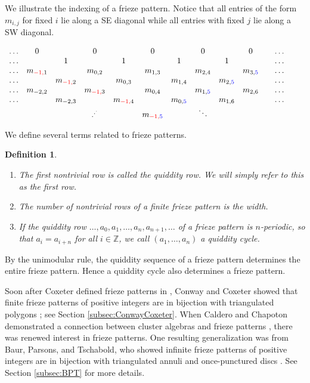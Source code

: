 \documentclass[12pt]{article}
\newtheorem{definition}{Definition}
\theoremstyle{remark}
\newcommand*{\Z}{\mathbb{Z}}
\begin{document}
We illustrate the indexing of a frieze pattern. Notice that all entries of the form $m_{i,j}$ for fixed $i$ lie along a SE diagonal while all entries with fixed $j$ lie along a SW diagonal. 

\begin{center}
$\begin{array}{ccccccccccccccccccccccccc}
 \ldots&0&&0&&0&&0&&0&&\ldots\\
 \ldots& &1&&1&&1&&1&&&\ldots\\
 \ldots&m_{\color{red}{-1},\color{black}{1}}&&m_{0,2}&&m_{1,3}&& m_{2,4}&&m_{3,\color{blue}{5}}&&\ldots\\
  \ldots&&m_{\color{red}{-1},\color{black}{2}}&&m_{0,3}&&m_{1,4}&&m_{2,\color{blue}{5}}&&&\ldots\\
 \ldots  & m_{-2,2}&&m_{\color{red}{-1},\color{black}{3}}&&m_{0,4}&&m_{1,\color{blue}{5}}&&m_{2,6}&&\ldots\\
 \ldots &&m_{-2,3}&&m_{\color{red}{-1},\color{black}{4}}&&m_{0,\color{blue}{5}}&&m_{1,6}&&&\ldots\\
 &&&.^{.^.}&&m_{\color{red}{-1},\color{blue}{5}}&&\ddots&&&&&&
 \end{array}$
 \end{center}
 \vspace{0.2cm}
 
  We define several terms related to frieze patterns.
 
 \begin{definition}
 \begin{enumerate}
\item The first nontrivial row is called the \emph{quiddity row}. We will simply refer to this as the first row.  
\item The number of nontrivial rows of a finite frieze pattern is the \emph{width}.
\item If the quiddity row $\ldots, a_0, a_1,\ldots,a_n, a_{n+1},\ldots$  of a frieze pattern is $n$-periodic, so that $a_i = a_{i+n}$ for all $i \in \Z$, we call $(a_1,\ldots,a_n)$ a \emph{quiddity cycle}.
\end{enumerate}
\end{definition}

By the unimodular rule, the quiddity sequence of a frieze pattern determines the entire frieze pattern. Hence a quiddity cycle also determines a frieze pattern.

Soon after Coxeter defined frieze patterns in \cite{11}, Conway and Coxeter showed that finite frieze patterns of positive integers are in bijection with triangulated polygons \cite{10}; see Section \ref{subsec:ConwayCoxeter}. When Caldero and Chapoton demonstrated a connection between cluster algebras and frieze patterns \cite{6}, there was renewed interest in frieze patterns. One resulting generalization was from Baur, Parsons, and Tschabold, who showed infinite frieze patterns of positive integers are in bijection with triangulated annuli and once-punctured discs \cite{1}. See Section \ref{subsec:BPT} for more details.
\end{document}
